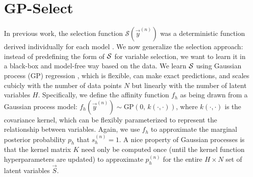 \section{GP-Select}
%
In previous work, the selection function $\mathcal{S}(\vec{y}^{(n)})$ 
was a deterministic function derived  individually for each model 
\citep[see e.g.][]{SheltonEtAl2011, SheltonEtAl2012, DaiLucke2012a, DaiLucke2012b,
BornscheinEtAl2013, SheikhEtAl2014}.
%
We now generalize the selection approach:  %
instead of predefining the form of $\mathcal{S}$ for variable selection, we want
to learn it in a black-box and model-free way based on the data.
%
We learn $\mathcal{S}$  using Gaussian process (GP) regression
\citep[e.g.][]{RasmussenGPbook}, which is flexible, can make exact predictions,
and scales cubicly with the number of data points $N$ but linearly with the number of latent variables $H$.  
%
%
%
%
Specifically, we define the affinity function $f_h$ as being drawn from a Gaussian process model: 
$f_h(\vec{y}^{(n)}) \sim \text{GP}\left(0, \, k(\cdot,\cdot) \right)$, where $k(\cdot, \cdot)$ is the covariance kernel, 
which can be flexibly parameterized to represent the relationship between variables.
Again, we use $f_h$ to approximate the marginal posterior probability $p_h$ that $s_h^{(n)}=1$.
%
A nice property of Gaussian processes is that the kernel matrix $K$ need only be computed once (until the kernel function hyperparameters are updated) 
to approximate $p_h^{(n)}$ for the entire $H\times N$ set of latent variables $\vec{S}$.

